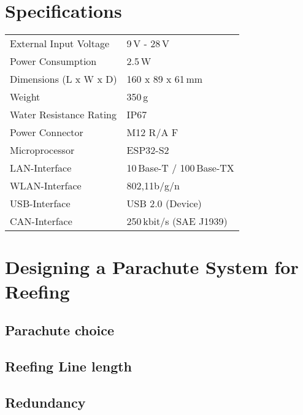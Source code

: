 \section{Specifications}
\begin{center}
    \begin{tabular}{p{6.4cm} p{6.4cm}}
    External Input Voltage          & 9\,V - 28\,V                      \\ %
    Power Consumption               & 2.5\,W                            \\ %
    Dimensions (L x W x D)          & 160 x 89 x 61\,mm                 \\ %
    Weight                          & 350\,g                            \\ %
    Water Resistance Rating         & IP67                              \\ %
    Power Connector                 & M12 R/A F                         \\ %
    Microprocessor                  & ESP32-S2                          \\ %
    LAN-Interface                   & 10\,Base-T / 100\,Base-TX         \\ %
    WLAN-Interface                  & 802,11b/g/n                       \\ %
    USB-Interface                   & USB 2.0 (Device)                  \\ %
    CAN-Interface                   & 250\,kbit/s (SAE J1939)           \\ %
    
    \end{tabular}
\end{center}

\section{Designing a Parachute System for Reefing}


\subsection{Parachute choice}

\subsection{Reefing Line length}

\subsection{Redundancy} \label{Hard Reset}
